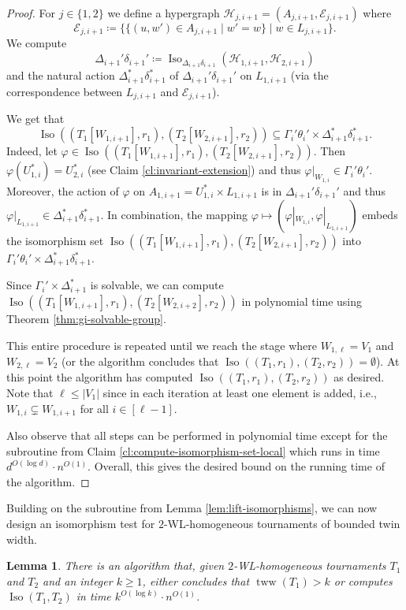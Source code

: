 \PassOptionsToPackage{dvipsnames,svgnames}{xcolor}\documentclass[10pt,a4paper]{article}
\newtheorem{lemma}{Lemma}[section]
\newcommand{\CE}{{\mathcal E}}
\newcommand{\CH}{{\mathcal H}}
\DeclareMathOperator{\Iso}{Iso}
\DeclareMathOperator{\tww}{tww}
\begin{document}
\begin{proof}
 For $j \in \{1,2\}$ we define a hypergraph $\CH_{j,i+1} = (A_{j,i+1},\CE_{j,i+1})$ where
 \[\CE_{j,i+1} \coloneqq \{\{(u,w') \in A_{j,i+1} \mid w' = w\} \mid w \in L_{j,i+1}\}.\]
 We compute
 \[\Delta_{i+1}'\delta_{i+1}' \coloneqq \Iso_{\Delta_{i+1}\delta_{i+1}}(\CH_{1,i+1},\CH_{2,i+1})\]
 and the natural action $\Delta_{i+1}^*\delta_{i+1}^*$ of $\Delta_{i+1}'\delta_{i+1}'$ on $L_{1,i+1}$ (via the correspondence between $L_{j,i+1}$ and $\CE_{j,{i+1}}$).

 We get that
 \[\Iso((T_1[W_{1,i+1}],r_1),(T_2[W_{2,i+1}],r_2)) \subseteq \Gamma_i'\theta_i' \times \Delta_{i+1}^*\delta_{i+1}^*.\]
 Indeed, let $\varphi\in \Iso((T_1[W_{1,i+1}],r_1),(T_2[W_{2,i+1}],r_2))$.
 Then $\varphi(U_{1,i}^*) = U_{2,i}^*$ (see Claim \ref{cl:invariant-extension}) and thus $\varphi|_{W_{1,i}} \in \Gamma_i'\theta_i'$.
 Moreover, the action of $\varphi$ on $A_{1,i+1} = U_{1,i}^* \times L_{1,i+1}$ is in $\Delta_{i+1}'\delta_{i+1}'$ and thus $\varphi|_{L_{1,i+1}} \in \Delta_{i+1}^*\delta_{i+1}^*$.
 In combination, the mapping $\varphi\mapsto (\varphi|_{W_{1,i}},\varphi|_{L_{1,i+1}})$ embeds the isomorphism set $\Iso((T_1[W_{1,i+1}],r_1),(T_2[W_{2,i+1}],r_2))$ into $\Gamma_i'\theta_i' \times \Delta_{i+1}^*\delta_{i+1}^*$.

 Since $\Gamma_i' \times \Delta_{i+1}^*$ is solvable, we can compute $\Iso((T_1[W_{1,i+1}],r_1),(T_2[W_{2,i+2}],r_2))$ in polynomial time using Theorem \ref{thm:gi-solvable-group}.

 This entire procedure is repeated until we reach the stage where $W_{1,\ell} = V_1$ and $W_{2,\ell} = V_2$ (or the algorithm concludes that $\Iso((T_1,r_1),(T_2,r_2)) = \emptyset$).
 At this point the algorithm has computed $\Iso((T_1,r_1),(T_2,r_2))$ as desired.
 Note that $\ell \leq |V_1|$ since in each iteration at least one element is added, i.e., $W_{1,i} \subsetneq W_{1,i+1}$ for all $i \in [\ell-1]$.

 Also observe that all steps can be performed in polynomial time except for the subroutine from Claim \ref{cl:compute-isomorphism-set-local} which runs in time $d^{O(\log d)} \cdot n^{O(1)}$.
 Overall, this gives the desired bound on the running time of the algorithm.
\end{proof}

Building on the subroutine from Lemma \ref{lem:lift-isomorphisms}, we can now design an isomorphism test for $2$-WL-homogeneous tournaments of bounded twin width.

\begin{lemma}
 \label{lem:tww-isomorphism-unicolored}
 There is an algorithm that, given $2$-WL-homogeneous tournaments $T_1$ and $T_2$ and an integer $k \geq 1$, either concludes that $\tww(T_1) > k$ or computes $\Iso(T_1,T_2)$ in time $k^{O(\log k)} \cdot n^{O(1)}$.
\end{lemma}
\end{document}
